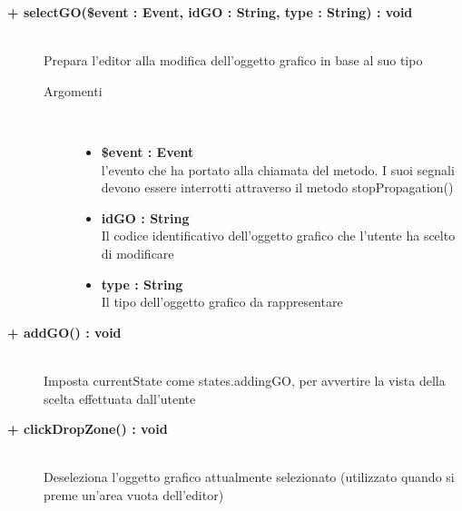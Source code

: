 \begin{description}
	\begin{description}
		\item[\textbf{\color{blue}+ selectGO(\$event : Event, idGO : String, type : String) : void 	}] \hfill \\
			Prepara l'editor alla modifica dell'oggetto grafico in base al suo tipo
			
		\begin{description}
			\item[Argomenti] \hfill \\
				\begin{itemize}
				
					\item \textbf{\$event : Event	} \hfill \\
					l'evento che ha portato alla chiamata del metodo. I suoi segnali devono essere interrotti attraverso il metodo stopPropagation()		
					\item \textbf{idGO : String	} \hfill \\
					Il codice identificativo dell'oggetto grafico che l'utente ha scelto di modificare
					\item \textbf{type : String	} \hfill \\
					Il tipo dell'oggetto grafico da rappresentare
				\end{itemize}
				
		\end{description}
	\end{description}
	
	\begin{description}
		\item[\textbf{\color{blue}+ addGO() : void	}] \hfill \\
			Imposta currentState come states.addingGO, per avvertire la vista della scelta effettuata dall'utente
		
	\end{description}
	
	\begin{description}
		\item[\textbf{\color{blue}+ clickDropZone() : void	}] \hfill \\
			Deseleziona l'oggetto grafico attualmente selezionato (utilizzato quando si preme un'area vuota dell'editor)
		
	\end{description}
	

\end{description}
